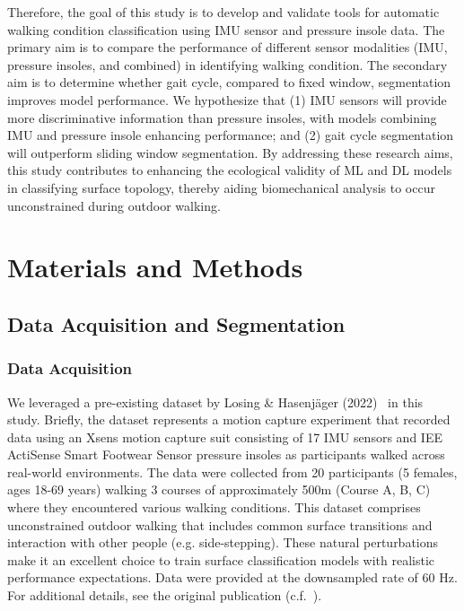 \documentclass[sensors,article,submit,pdftex,moreauthors]{Definitions/mdpi}
\begin{document}
Therefore, the goal of this study is to develop and validate tools for automatic walking condition classification using IMU sensor and pressure \textcolor{revision}{insole} data. The primary aim is to compare the performance of different sensor modalities (IMU, pressure insoles, and combined) in identifying walking condition. The secondary aim is to determine whether gait cycle, compared to fixed window, segmentation improves model performance. We hypothesize that (1) IMU sensors will provide more discriminative information than pressure insoles, with models combining IMU and pressure insole enhancing performance; and (2) gait cycle segmentation will outperform sliding window segmentation. By addressing these research aims, this study contributes to enhancing the ecological validity of ML and DL models in classifying surface topology, thereby aiding biomechanical analysis to occur unconstrained during outdoor walking.




\section{Materials and Methods}
\label{sec:Methods}

\subsection{Data Acquisition and Segmentation}
\subsubsection{Data Acquisition}
We leveraged a pre-existing dataset by Losing \& Hasenj{\"a}ger (2022)~\cite{losing_2022} in this study. Briefly, the dataset represents a motion capture experiment that recorded data using an Xsens motion capture suit consisting of 17 IMU sensors \cite{xsens} and IEE ActiSense Smart Footwear Sensor pressure insoles \cite{foot_pressure} as participants walked across real-world environments. The data were collected from 20 participants (5 females, ages 18-69 years) walking 3 courses of approximately 500m (Course A, B, C) where they encountered various walking conditions. \textcolor{revision2}{This dataset comprises unconstrained outdoor walking that includes common surface transitions and interaction with other people (e.g. side-stepping). These natural perturbations make it an excellent choice to train  surface classification models with realistic performance expectations.} Data were provided at the downsampled rate of 60 Hz. For additional details, see the original publication (c.f.~\cite{losing_2022}).
\end{document}
